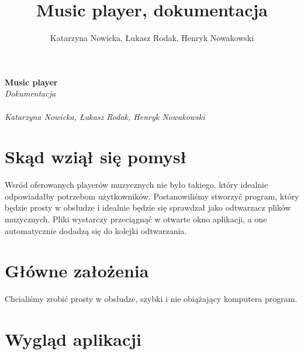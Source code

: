\documentclass{article}
\title{Music player, dokumentacja}
\author{Katarzyna Nowicka, Łukasz Rodak, Henryk Nowakowski}
\date{ }
\begin{document}
\begin{titlepage}

{\selectfont

   \begin{center}
      \Huge\textbf{Music player}\\
      \huge\textit{Dokumentacja}\\~\\
      \large\textit{Katarzyna Nowicka, Łukasz Rodak, Henryk Nowakowski}
      
   \end{center}
   
   }
\end{titlepage}


\tableofcontents

\newpage
 
\section{Skąd wziął się pomysł}
 
Wsród oferowanych playerów muzycznych nie było takiego, który idealnie odpowiadałby potrzebom użytkowników. Postanowiliśmy stworzyć program, który będzie prosty w obsłudze i idealnie będzie się sprawdzał jako odtwarzacz plików muzycznych. Pliki wystarczy przeciągnąć w otwarte okno aplikacji, a one automatycznie dodadzą się do kolejki odtwarzania.



 

 
\section{Główne założenia}
 
 
 Chcialiśmy zrobić prosty w obsłudze, szybki i nie obiążający komputera program.

\section{Wygląd aplikacji}
 
\end{document}
